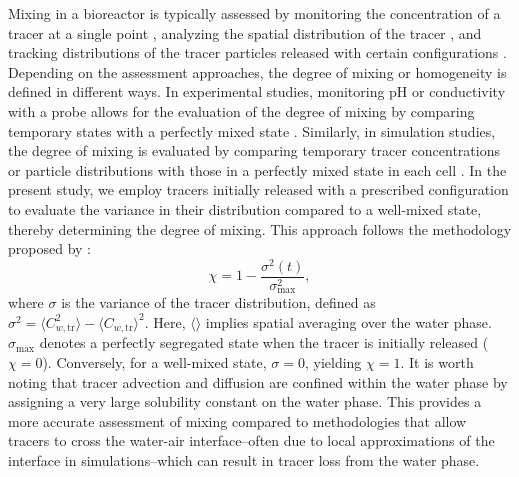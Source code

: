 \documentclass[final,3p,times,twocolumn,authoryear]{elsarticle}
\theoremstyle{definition}
\begin{document}
Mixing in a bioreactor is typically assessed by monitoring the concentration of a tracer at a single point \citep{Bach2017,Bai2019a,Svay2020}, analyzing the spatial distribution of the tracer \citep{Seidel2022}, and tracking distributions of the tracer particles released with certain configurations \citep{Siiria2009,Nguyen2018,Watanabe2022}. Depending on the assessment approaches, the degree of mixing or homogeneity is defined in different ways. In experimental studies, monitoring pH or conductivity with a probe allows for the evaluation of the degree of mixing by comparing temporary states with a perfectly mixed state \citep{Bach2017,Bai2019a}. Similarly, in simulation studies, the degree of mixing is evaluated by comparing temporary tracer concentrations or particle distributions with those in a perfectly mixed state in each cell \citep{Siiria2009,Nguyen2018,Seidel2022,Watanabe2022}. In the present study, we employ tracers initially released with a prescribed configuration to evaluate the variance in their distribution compared to a well-mixed state, thereby determining the degree of mixing. This approach follows the methodology proposed by \citet{Jha2011}:
\begin{equation} \label{eq:mixing_chi}
    \chi = 1-\frac{\sigma^2(t)}{\sigma_{\textrm{max}}^2},
\end{equation}
where $\sigma$ is the variance of the tracer distribution, defined as $\sigma^2 = \langle C_{w,\textrm{tr}}^2 \rangle - \langle C_{w,\textrm{tr}} \rangle^2$. Here, $\langle\rangle$ implies spatial averaging over the water phase. $\sigma_{\textrm{max}}$ denotes a perfectly segregated state when the tracer is initially released ($\chi=0$). Conversely, for a well-mixed state, $\sigma = 0$, yielding $\chi=1$. It is worth noting that tracer advection and diffusion are confined within the water phase by assigning a very large solubility constant on the water phase. This provides a more accurate assessment of mixing compared to methodologies that allow tracers to cross the water-air interface--often due to local approximations of the interface in simulations--which can result in tracer loss from the water phase.
\end{document}
